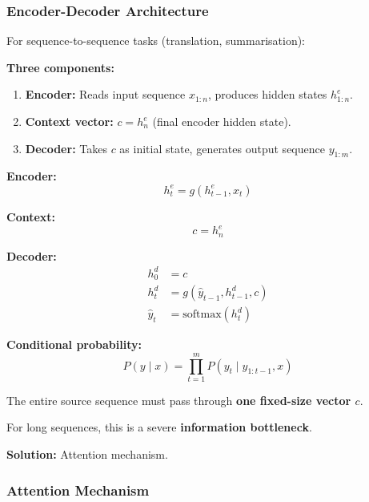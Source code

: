 \bigseparator

\subsubsection{Encoder-Decoder Architecture}

\begin{defbox}
For sequence-to-sequence tasks (translation, summarisation):

\textbf{Three components:}
\begin{enumerate}
  \item \textbf{Encoder:} Reads input sequence $x_{1:n}$, produces hidden states $h^e_{1:n}$.
  \item \textbf{Context vector:} $c = h^e_n$ (final encoder hidden state).
  \item \textbf{Decoder:} Takes $c$ as initial state, generates output sequence $y_{1:m}$.
\end{enumerate}
\end{defbox}

\begin{defbox}
\textbf{Encoder:}
\[
h^e_t = g(h^e_{t-1}, x_t)
\]

\textbf{Context:}
\[
c = h^e_n
\]

\textbf{Decoder:}
\begin{align*}
h^d_0 &= c \\
h^d_t &= g(\hat{y}_{t-1}, h^d_{t-1}, c) \\
\hat{y}_t &= \text{softmax}(h^d_t)
\end{align*}

\textbf{Conditional probability:}
\[
P(y \mid x) = \prod_{t=1}^{m} P(y_t \mid y_{1:t-1}, x)
\]
\end{defbox}

\begin{tipbox}
The entire source sequence must pass through \textbf{one fixed-size vector $c$}.

For long sequences, this is a severe \textbf{information bottleneck}.

\textbf{Solution:} Attention mechanism.
\end{tipbox}

\bigseparator

\subsubsection{Attention Mechanism}

